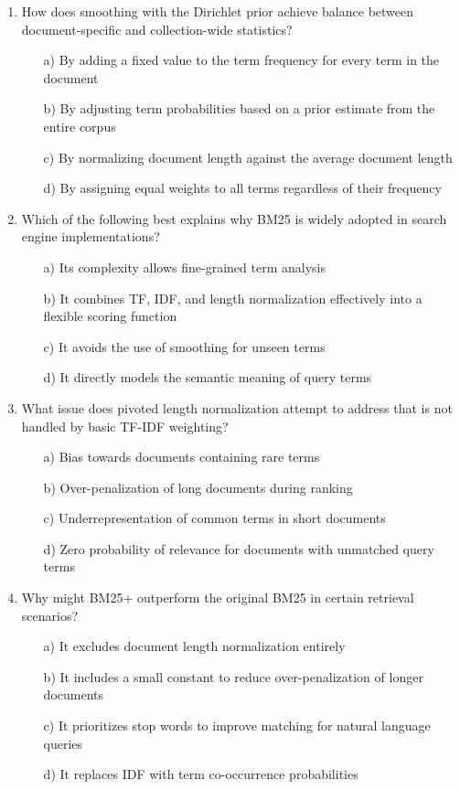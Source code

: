 \documentclass[8pt]{extarticle}
\begin{document}
\begin{multicols}{2}
\begin{enumerate}
\item How does smoothing with the Dirichlet prior achieve balance between document-specific and collection-wide statistics?
\begin{itemize}
    \item[a)] By adding a fixed value to the term frequency for every term in the document
    \item[b)] By adjusting term probabilities based on a prior estimate from the entire corpus
    \item[c)] By normalizing document length against the average document length
    \item[d)] By assigning equal weights to all terms regardless of their frequency
\end{itemize}
 

\item Which of the following best explains why BM25 is widely adopted in search engine implementations?
\begin{itemize}
    \item[a)] Its complexity allows fine-grained term analysis
    \item[b)] It combines TF, IDF, and length normalization effectively into a flexible scoring function
    \item[c)] It avoids the use of smoothing for unseen terms
    \item[d)] It directly models the semantic meaning of query terms
\end{itemize}
 

\item What issue does pivoted length normalization attempt to address that is not handled by basic TF-IDF weighting?
\begin{itemize}
    \item[a)] Bias towards documents containing rare terms
    \item[b)] Over-penalization of long documents during ranking
    \item[c)] Underrepresentation of common terms in short documents
    \item[d)] Zero probability of relevance for documents with unmatched query terms
\end{itemize}
 

\item Why might BM25+ outperform the original BM25 in certain retrieval scenarios?
\begin{itemize}
    \item[a)] It excludes document length normalization entirely
    \item[b)] It includes a small constant to reduce over-penalization of longer documents
    \item[c)] It prioritizes stop words to improve matching for natural language queries
    \item[d)] It replaces IDF with term co-occurrence probabilities
\end{itemize}
 


\end{enumerate}
\end{multicols}
\end{document}
